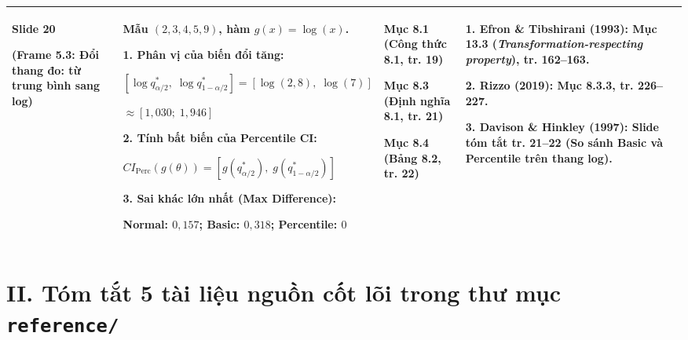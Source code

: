 \documentclass[10pt,a4paper]{article}
\begin{document}
\begin{longtable}{|>{\RaggedRight\arraybackslash}p{2.1cm}|>{\RaggedRight\arraybackslash}p{5.1cm}|>{\RaggedRight\arraybackslash}p{3.1cm}|>{\RaggedRight\arraybackslash}p{6.3cm}|}
\textbf{Slide 20}\par(Frame 5.3: Đổi thang đo: từ trung bình sang log) &
Mẫu $(2,3,4,5,9)$, hàm $g(x)=\log(x)$.\par
\textbf{1. Phân vị của biến đổi tăng:}\par
$[\log q_{\alpha/2}^*,\; \log q_{1-\alpha/2}^*] = [\log(2{,}8),\; \log(7)]$\par
$\approx [1{,}030;\; 1{,}946]$\par
\textbf{2. Tính bất biến của Percentile CI:}\par
$CI_{\text{Perc}}(g(\theta)) = [g(q_{\alpha/2}^*),\; g(q_{1-\alpha/2}^*)]$\par
\textbf{3. Sai khác lớn nhất (Max Difference):}\par
Normal: $0{,}157$; Basic: $0{,}318$; Percentile: $0$ &
Mục 8.1 (Công thức 8.1, tr. 19)\par
Mục 8.3 (Định nghĩa 8.1, tr. 21)\par
Mục 8.4 (Bảng 8.2, tr. 22) &
\textbf{1. Efron \& Tibshirani (1993)}: Mục 13.3 (\textit{Transformation-respecting property}), tr. 162--163.\par
\textbf{2. Rizzo (2019)}: Mục 8.3.3, tr. 226--227.\par
\textbf{3. Davison \& Hinkley (1997)}: Slide tóm tắt tr. 21--22 (So sánh Basic và Percentile trên thang log). \\
\hline

\end{longtable}

\normalsize
\vspace{0.4cm}

\section*{II. Tóm tắt 5 tài liệu nguồn cốt lõi trong thư mục \texttt{reference/}}
\end{document}
